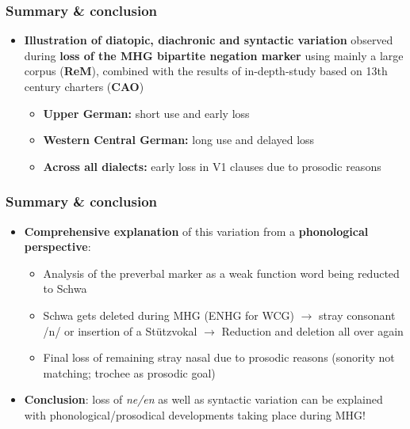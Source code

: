 \documentclass[xcolor=table, compress, %
handout
]{beamer}
\begin{document}
\begin{frame}
\frametitle{Summary \& conclusion}

\begin{itemize} 
\item \textbf{Illustration of diatopic, diachronic and syntactic variation} observed during \textbf{loss of the MHG bipartite negation marker} using mainly a large corpus (\textbf{ReM}), combined with the results of in-depth-study based on 13th century charters (\textbf{CAO})
\begin{itemize} 
\item \textbf{Upper German:} short use and early loss
\item \textbf{Western Central German:} long use and delayed loss
\item \textbf{Across all dialects:} early loss in V1 clauses due to prosodic reasons
\end{itemize} 
\end{itemize} 

\end{frame}

\begin{frame}
\frametitle{Summary \& conclusion}
\begin{itemize} 

\item \textbf{Comprehensive explanation} of this variation from a \textbf{phonological perspective}:
\begin{itemize} 
\item Analysis of the preverbal marker as a weak function word being reducted to Schwa
\item Schwa gets deleted during MHG (ENHG for WCG) $\rightarrow$ stray consonant /n/ or insertion of a \glqq Stützvokal\grqq{} $\rightarrow$ Reduction and deletion all over again
\item Final loss of remaining stray nasal due to prosodic reasons (sonority not matching; trochee as prosodic goal)
\end{itemize}
\item \textbf{Conclusion}: loss of \textit{ne/en} as well as syntactic variation can be explained with phonological/prosodical developments taking place during MHG! 
\end{itemize}
\end{frame}
\end{document}
